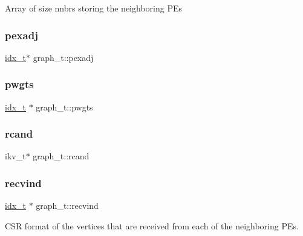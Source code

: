 Array of size nnbrs storing the neighboring P\+Es \mbox{\label{a00734_a9197f6a8bb6e42eee08a454a41cb9eb0}} 
\subsubsection{\texorpdfstring{pexadj}{pexadj}}
{\footnotesize\ttfamily \hyperlink{a00876_aaa5262be3e700770163401acb0150f52}{idx\+\_\+t}$\ast$ graph\+\_\+t\+::pexadj}

\mbox{\label{a00734_aa90c16af72fefbbcb6be11e98c15b95f}} 
\subsubsection{\texorpdfstring{pwgts}{pwgts}}
{\footnotesize\ttfamily \hyperlink{a00876_aaa5262be3e700770163401acb0150f52}{idx\+\_\+t} $\ast$ graph\+\_\+t\+::pwgts}

\mbox{\label{a00734_a0ddc1a8e97d1d686b4b86060a4048fe5}} 
\subsubsection{\texorpdfstring{rcand}{rcand}}
{\footnotesize\ttfamily ikv\+\_\+t$\ast$ graph\+\_\+t\+::rcand}

\mbox{\label{a00734_a81694becff193fd2e2d1a4cc570f92f7}} 
\subsubsection{\texorpdfstring{recvind}{recvind}}
{\footnotesize\ttfamily \hyperlink{a00876_aaa5262be3e700770163401acb0150f52}{idx\+\_\+t} $\ast$ graph\+\_\+t\+::recvind}

C\+SR format of the vertices that are received from each of the neighboring P\+Es. \mbox{\label{a00734_a2ffabf365a5f36b6871533a05c02d6b3}} 
